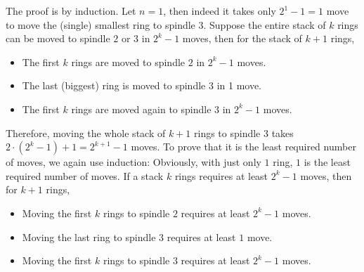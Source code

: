 \begin{solution} %
  The proof is by induction. Let $n = 1$, then indeed it
  takes only $2^1 - 1 = 1$ move to move the (single)
  smallest ring to spindle $3$. Suppose the entire stack of
  $k$ rings can be moved to spindle $2$ or $3$
  in $2^k - 1$ moves,
  then for the stack of $k + 1$ rings,
  \begin{itemize}
    \item The first $k$ rings are moved to spindle $2$
    in $2^k - 1$ moves.
    \item The last (biggest) ring is moved to spindle $3$
    in 1 move.
    \item The first $k$ rings are moved again to spindle $3$
    in $2^k - 1$ moves.
  \end{itemize}
  Therefore, moving the whole stack of $k + 1$ rings to
  spindle $3$ takes
  $2 \cdot (2^k - 1) + 1 = 2^{k+1} - 1$ moves. To prove that
  it is the least required number of moves, we again use
  induction: Obviously, with just only $1$ ring, $1$
  is the least required number of moves. If a stack $k$
  rings requires at least $2^k - 1$ moves, then for $k + 1$
  rings,
  \begin{itemize}
    \item Moving the first $k$ rings to spindle $2$ requires
    at least $2^k - 1$ moves.
    \item Moving the last ring to spindle $3$ requires
    at least $1$ move.
    \item Moving the first $k$ rings to spindle $3$ requires
    at least $2^k - 1$ moves.
  \end{itemize}
\end{solution}

